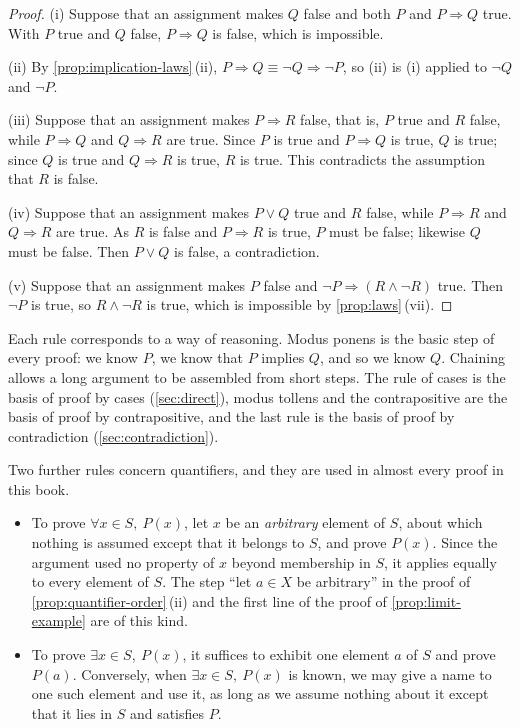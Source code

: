\begin{proof}
(i) Suppose that an assignment makes $Q$ false and both $P$ and $P\Rightarrow Q$ true. With $P$ true and $Q$ false, $P\Rightarrow Q$ is false, which is impossible.

(ii) By \cref{prop:implication-laws}\,(ii), $P\Rightarrow Q\equiv\neg Q\Rightarrow\neg P$, so (ii) is (i) applied to $\neg Q$ and $\neg P$.

(iii) Suppose that an assignment makes $P\Rightarrow R$ false, that is, $P$ true and $R$ false, while $P\Rightarrow Q$ and $Q\Rightarrow R$ are true. Since $P$ is true and $P\Rightarrow Q$ is true, $Q$ is true; since $Q$ is true and $Q\Rightarrow R$ is true, $R$ is true. This contradicts the assumption that $R$ is false.

(iv) Suppose that an assignment makes $P\vee Q$ true and $R$ false, while $P\Rightarrow R$ and $Q\Rightarrow R$ are true. As $R$ is false and $P\Rightarrow R$ is true, $P$ must be false; likewise $Q$ must be false. Then $P\vee Q$ is false, a contradiction.

(v) Suppose that an assignment makes $P$ false and $\neg P\Rightarrow(R\wedge\neg R)$ true. Then $\neg P$ is true, so $R\wedge\neg R$ is true, which is impossible by \cref{prop:laws}\,(vii).
\end{proof}

Each rule corresponds to a way of reasoning. Modus ponens is the basic step of every proof: we know $P$, we know that $P$ implies $Q$, and so we know $Q$. Chaining allows a long argument to be assembled from short steps. The rule of cases is the basis of proof by cases (\cref{sec:direct}), modus tollens and the contrapositive are the basis of proof by contrapositive, and the last rule is the basis of proof by contradiction (\cref{sec:contradiction}).

Two further rules concern quantifiers, and they are used in almost every proof in this book.
\begin{itemize}
\item To prove $\forall x\in S,\ P(x)$, let $x$ be an \emph{arbitrary} element of $S$, about which nothing is assumed except that it belongs to $S$, and prove $P(x)$. Since the argument used no property of $x$ beyond membership in $S$, it applies equally to every element of $S$. The step ``let $a\in X$ be arbitrary'' in the proof of \cref{prop:quantifier-order}\,(ii) and the first line of the proof of \cref{prop:limit-example} are of this kind.
\item To prove $\exists x\in S,\ P(x)$, it suffices to exhibit one element $a$ of $S$ and prove $P(a)$. Conversely, when $\exists x\in S,\ P(x)$ is known, we may give a name to one such element and use it, as long as we assume nothing about it except that it lies in $S$ and satisfies $P$.
\end{itemize}

